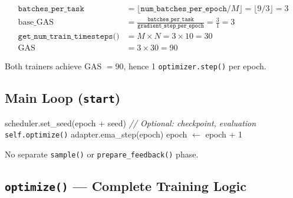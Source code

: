 \documentclass[11pt]{article}
\begin{document}
\begin{align}
\texttt{batches\_per\_task} &= \lfloor \texttt{num\_batches\_per\_epoch} / M \rfloor = \lfloor 9/3 \rfloor = 3 \\[6pt]
\text{base\_GAS} &= \frac{\texttt{batches\_per\_task}}{\texttt{gradient\_step\_per\_epoch}} = \frac{3}{1} = 3 \\[6pt]
\texttt{get\_num\_train\_timesteps()} &= M \times N = 3 \times 10 = 30 \\[6pt]
\text{GAS} &= 3 \times 30 = 90
\end{align}

Both trainers achieve GAS $= 90$, hence 1 \texttt{optimizer.step()} per epoch.

\subsection{Main Loop (\texttt{start})}

\begin{algorithm}[H]
\caption{DiffusionOPDTrainer.start()}
\begin{algorithmic}
    \STATE scheduler.set\_seed(epoch + seed)
    \STATE \textit{// Optional: checkpoint, evaluation}
    \STATE \texttt{self.optimize()} 
    \STATE adapter.ema\_step(epoch)
    \STATE epoch $\leftarrow$ epoch + 1
\ENDWHILE
\end{algorithmic}
\end{algorithm}

No separate \texttt{sample()} or \texttt{prepare\_feedback()} phase.

\subsection{\texttt{optimize()} --- Complete Training Logic}
\end{document}
